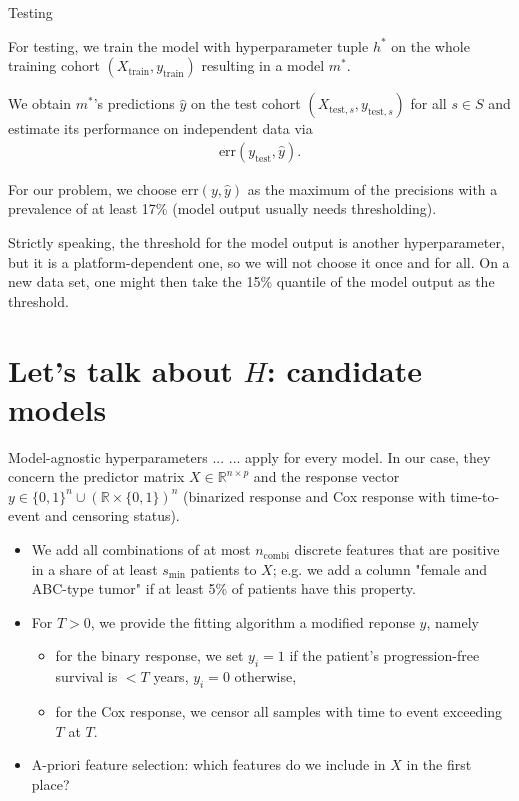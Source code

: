 \documentclass[10pt, aspectratio=169]{beamer}
\def\RR{\mathbb{R}}
\begin{document}
\begin{frame}{Testing}

  For testing, we train the model with hyperparameter tuple $h^*$ on the whole
  training cohort $(X_\text{train}, y_{\text{train}})$ resulting in a model $m^*$.

  We obtain $m^*$'s predictions $\hat{y}$ on the test cohort 
  $(X_{\text{test}, s}, y_{\text{test}, s})$ for all $s \in S$ and estimate 
  its performance on independent data via
  \begin{align*}
    \text{err}(y_{\text{test}}, \hat{y}).
  \end{align*}

  For our problem, we choose $\text{err}(y, \hat{y})$ as the maximum of the precisions
  with a prevalence of at least 17\% (model output usually needs thresholding).

  Strictly speaking, the threshold for the model output is another hyperparameter, 
  but it is a platform-dependent one, so we will not choose it once and for all. 
  On a new data set, one might then take the 15\% quantile of the model output 
  as the threshold.
\end{frame}

\section{Let's talk about $H$: candidate models}

\begin{frame}{Model-agnostic hyperparameters ...}
  ... apply for every model. In our case, they concern the predictor matrix 
  $X \in \RR^{n \times p}$ and the response vector $y \in \{ 0, 1 \}^n \cup 
  (\RR \times \{0, 1 \})^n$ (binarized response and Cox response with time-to-event 
  and censoring status).

  \begin{itemize}
    \item We add all combinations of at most $n_{\text{combi}}$ discrete features 
      that are positive in a share of at least $s_{\text{min}}$ patients to $X$; e.g. 
      we add a column "female and ABC-type tumor" if at least 5\% of patients 
      have this property.
    \item For $T > 0$, we provide the fitting algorithm a modified reponse $y$, namely
      \begin{itemize}
        \item for the binary response, we set $y_i = 1$ if the patient's progression-free 
          survival is $< T$ years, $y_i = 0$ otherwise,
        \item for the Cox response, we censor all samples with time to event 
          exceeding $T$ at $T$.
      \end{itemize}
    \item A-priori feature selection: which features do we include in $X$ in the 
      first place?
  \end{itemize}
\end{frame}
\end{document}
